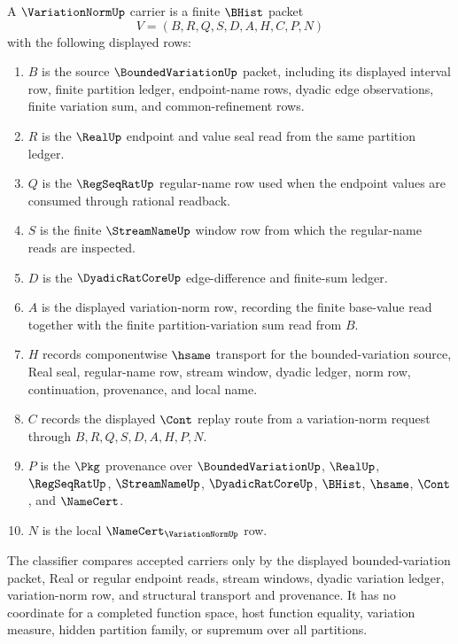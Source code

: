 \begin{definition}
\label{def:variation-norm-carrier}
A $\VariationNormUp$ carrier is a finite $\BHist$ packet
$$
V=(B,R,Q,S,D,A,H,C,P,N)
$$
with the following displayed rows:
\begin{enumerate}
\item $B$ is the source $\BoundedVariationUp$ packet, including its displayed interval row, finite partition ledger, endpoint-name rows, dyadic edge observations, finite variation sum, and common-refinement rows.
\item $R$ is the $\RealUp$ endpoint and value seal read from the same partition ledger.
\item $Q$ is the $\RegSeqRatUp$ regular-name row used when the endpoint values are consumed through rational readback.
\item $S$ is the finite $\StreamNameUp$ window row from which the regular-name reads are inspected.
\item $D$ is the $\DyadicRatCoreUp$ edge-difference and finite-sum ledger.
\item $A$ is the displayed variation-norm row, recording the finite base-value read together with the finite partition-variation sum read from $B$.
\item $H$ records componentwise $\hsame$ transport for the bounded-variation source, Real seal, regular-name row, stream window, dyadic ledger, norm row, continuation, provenance, and local name.
\item $C$ records the displayed $\Cont$ replay route from a variation-norm request through $B,R,Q,S,D,A,H,P,N$.
\item $P$ is the $\Pkg$ provenance over $\BoundedVariationUp$, $\RealUp$, $\RegSeqRatUp$, $\StreamNameUp$, $\DyadicRatCoreUp$, $\BHist$, $\hsame$, $\Cont$, and $\NameCert$.
\item $N$ is the local $\NameCert_{\VariationNormUp}$ row.
\end{enumerate}
The classifier compares accepted carriers only by the displayed bounded-variation packet, Real or regular endpoint reads, stream windows, dyadic variation ledger, variation-norm row, and structural transport and provenance. It has no coordinate for a completed function space, host function equality, variation measure, hidden partition family, or supremum over all partitions.
\end{definition}

